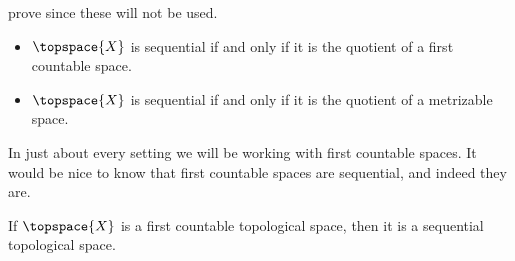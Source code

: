 \documentclass{article}                                                        %
\begin{document}
        prove since these will not be used.
        \begin{itemize}
            \item $\topspace{X}$ is sequential if and only if it is the quotient
                  of a first countable space.
            \item $\topspace{X}$ is sequential if and only if it is the quotient
                  of a metrizable space.
        \end{itemize}
        In just about every setting we will be working with first countable
        spaces. It would be nice to know that first countable spaces are
        sequential, and indeed they are.
        \begin{theorem}
            \label{thm:First_Countable_Implies_Sequential}%
            If $\topspace{X}$ is a first countable topological space, then it
            is a sequential topological space.
        \end{theorem}
\end{document}
